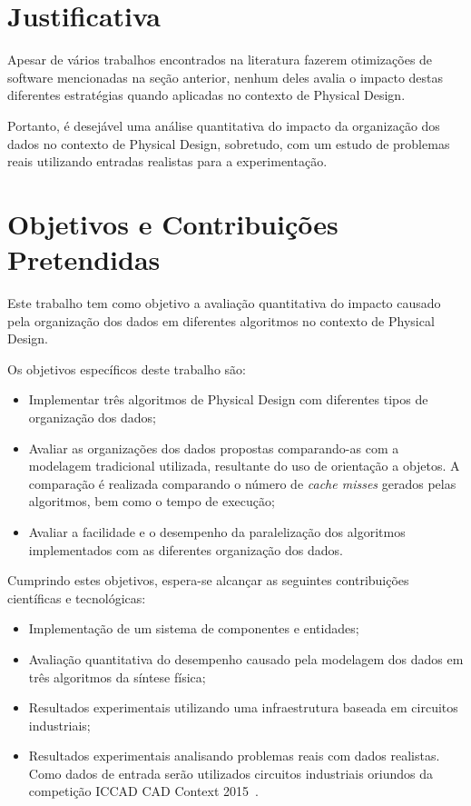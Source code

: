\section{Justificativa}

    Apesar de vários trabalhos encontrados na literatura fazerem otimizações de software mencionadas na seção anterior, nenhum deles avalia o impacto destas diferentes estratégias quando aplicadas no contexto de Physical Design.

    Portanto, é desejável uma análise quantitativa do impacto da organização dos dados no contexto de Physical Design, sobretudo, com um estudo de problemas reais utilizando entradas realistas para a experimentação.

\section{Objetivos e Contribuições Pretendidas}

    Este trabalho tem como objetivo a avaliação quantitativa do impacto causado pela organização dos dados em diferentes algoritmos no contexto de Physical Design.

    Os objetivos específicos deste trabalho são:

    \begin{itemize}
        \item Implementar três algoritmos de Physical Design com diferentes tipos de organização dos dados;
        \item Avaliar as organizações dos dados propostas comparando-as com a modelagem tradicional utilizada, resultante do uso de orientação a objetos. A comparação é realizada comparando o número de \textit{cache misses} gerados pelas algoritmos, bem como o tempo de execução;
        \item Avaliar a facilidade e o desempenho da paralelização dos algoritmos implementados com as diferentes organização dos dados.
    \end{itemize}

    Cumprindo estes objetivos, espera-se alcançar as seguintes contribuições científicas e tecnológicas:

    \begin{itemize}
        \item Implementação de um sistema de componentes e entidades;
        \item Avaliação quantitativa do desempenho causado pela modelagem dos dados em três algoritmos da síntese física;
        \item Resultados experimentais utilizando uma infraestrutura baseada em circuitos industriais;
        \item Resultados experimentais analisando problemas reais com dados realistas. Como dados de entrada serão utilizados circuitos industriais oriundos da competição ICCAD CAD Context 2015~\cite{kim2015}.
    \end{itemize}


